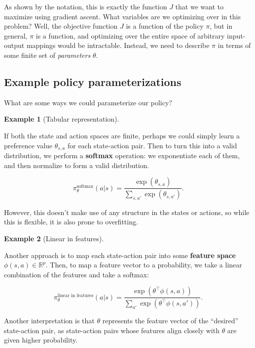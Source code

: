 \documentclass[
  letterpaper,
  DIV=11,
  numbers=noendperiod]{scrreprt}
\theoremstyle{plain}
\theoremstyle{plain}
\theoremstyle{definition}
\newtheorem{example}{Example}[chapter]
\theoremstyle{definition}
\theoremstyle{remark}
\begin{document}
As shown by the notation, this is exactly the function \(J\) that we
want to maximize using gradient ascent. What variables are we optimizing
over in this problem? Well, the objective function \(J\) is a function
of the policy \(\pi\), but in general, \(\pi\) is a function, and
optimizing over the entire space of arbitrary input-output mappings
would be intractable. Instead, we need to describe \(\pi\) in terms of
some finite set of \emph{parameters} \(\theta\).

\subsection{Example policy
parameterizations}\label{sec-parameterizations}

What are some ways we could parameterize our policy?

\begin{example}[Tabular
representation]\protect\hypertarget{exm-tabular-repr}{}\label{exm-tabular-repr}

If both the state and action spaces are finite, perhaps we could simply
learn a preference value \(\theta_{s,a}\) for each state-action pair.
Then to turn this into a valid distribution, we perform a
\textbf{softmax} operation: we exponentiate each of them, and then
normalize to form a valid distribution.

\[\pi^\text{softmax}_\theta(a | s) = \frac{\exp(\theta_{s,a})}{\sum_{s,a'} \exp (\theta_{s,a'})}.\]

However, this doesn't make use of any structure in the states or
actions, so while this is flexible, it is also prone to overfitting.

\end{example}

\begin{example}[Linear in
features]\protect\hypertarget{exm-linear-in-features}{}\label{exm-linear-in-features}

Another approach is to map each state-action pair into some
\textbf{feature space} \(\phi(s, a) \in \mathbb{R}^p\). Then, to map a
feature vector to a probability, we take a linear combination of the
features and take a softmax:

\[\pi^\text{linear in features}_{\theta}(a|s) = \frac{\exp(\theta^\top \phi(s, a))}{\sum_{a'} \exp(\theta^\top \phi(s, a'))}.\]

Another interpretation is that \(\theta\) represents the feature vector
of the ``desired'' state-action pair, as state-action pairs whose
features align closely with \(\theta\) are given higher probability.

\end{example}
\end{document}
